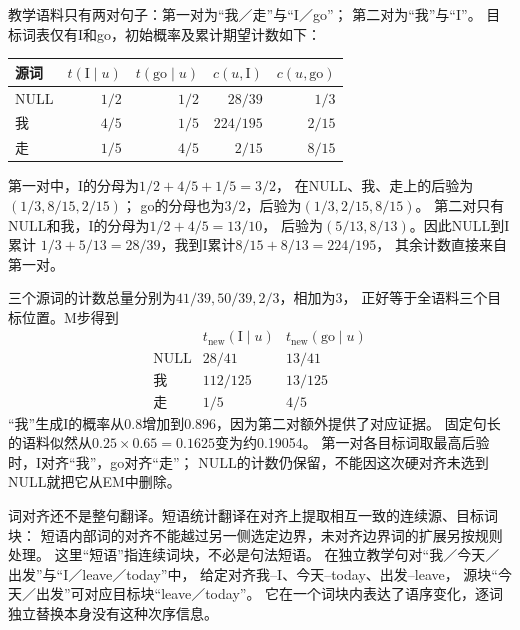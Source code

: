 \begin{example}[含空词的一轮EM]
  \label{ex:nlp-generation-em}
  教学语料只有两对句子：第一对为“我／走”与“I／go”；
  第二对为“我”与“I”。
  目标词表仅有I和go，初始概率及累计期望计数如下：
  \begin{center}
    \begin{tabular}{@{}lrrrr@{}}
      \toprule
      源词 & $t(\mathrm{I}\mid u)$ & $t(\mathrm{go}\mid u)$
        & $c(u,\mathrm{I})$ & $c(u,\mathrm{go})$\\
      \midrule
      NULL & $1/2$ & $1/2$ & $28/39$ & $1/3$\\
      我 & $4/5$ & $1/5$ & $224/195$ & $2/15$\\
      走 & $1/5$ & $4/5$ & $2/15$ & $8/15$\\
      \bottomrule
    \end{tabular}
  \end{center}
  第一对中，I的分母为$1/2+4/5+1/5=3/2$，
  在NULL、我、走上的后验为$(1/3,8/15,2/15)$；
  go的分母也为$3/2$，后验为$(1/3,2/15,8/15)$。
  第二对只有NULL和我，I的分母为$1/2+4/5=13/10$，
  后验为$(5/13,8/13)$。因此NULL到I累计
  $1/3+5/13=28/39$，我到I累计$8/15+8/13=224/195$，
  其余计数直接来自第一对。

  三个源词的计数总量分别为$41/39,50/39,2/3$，相加为3，
  正好等于全语料三个目标位置。M步得到
  \[
    \begin{array}{c|cc}
      &t_{\mathrm{new}}(\mathrm{I}\mid u)&t_{\mathrm{new}}(\mathrm{go}\mid u)\\
      \hline
      \mathrm{NULL}&28/41&13/41\\
      \text{我}&112/125&13/125\\
      \text{走}&1/5&4/5
    \end{array}
  \]
  “我”生成I的概率从0.8增加到0.896，因为第二对额外提供了对应证据。
  固定句长的语料似然从$0.25\times0.65=0.1625$变为约0.19054。
  第一对各目标词取最高后验时，I对齐“我”，go对齐“走”；
  NULL的计数仍保留，不能因这次硬对齐未选到NULL就把它从EM中删除。
\end{example}

词对齐还不是整句翻译。短语统计翻译在对齐上提取相互一致的连续源、目标词块：
短语内部词的对齐不能越过另一侧选定边界，未对齐边界词的扩展另按规则处理。
这里“短语”指连续词块，不必是句法短语。
在独立教学句对“我／今天／出发”与“I／leave／today”中，
给定对齐我--I、今天--today、出发--leave，
源块“今天／出发”可对应目标块“leave／today”。
它在一个词块内表达了语序变化，逐词独立替换本身没有这种次序信息。

